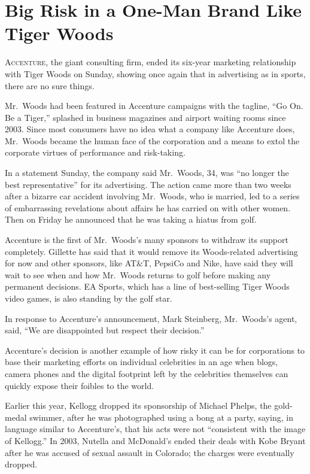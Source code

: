﻿\documentclass[12pt]{article}
\begin{document}
\section{Big Risk in a One-Man Brand Like Tiger Woods}

\lettrine{A}{ccenture}, the giant consulting firm, ended its six-year
marketing relationship with Tiger Woods on Sunday, showing once again that in advertising as in
sports, there are no sure things.

Mr.~Woods had been featured in Accenture campaigns with the tagline, ``Go On. Be a Tiger,'' splashed
in business magazines and airport waiting rooms since 2003. Since most consumers have no idea what a
company like Accenture does, Mr.~Woods became the human face of the corporation and a means to
extol\cite{extol} the corporate virtues of performance and risk-taking.

In a statement Sunday, the company said Mr.~Woods, 34, was ``no longer the best representative'' for
its advertising. The action came more than two weeks after a bizarre car accident involving
Mr.~Woods, who is married, led to a series of embarrassing revelations about affairs he has carried
on with other women. Then on Friday he announced that he was taking a hiatus\cite{hiatus} from golf.

Accenture is the first of Mr.~Woods's many sponsors to withdraw its support completely. Gillette has
said that it would remove its Woods-related advertising for now and other sponsors, like AT\&T,
PepsiCo and Nike, have said they will wait to see when and how Mr.~Woods returns to golf before
making any permanent decisions. EA Sports, which has a line of best-selling Tiger Woods video games,
is also standing by the golf star.

In response to Accenture's announcement, Mark Steinberg, Mr.~Woods's agent, said, ``We are
disappointed but respect their decision.''

Accenture's decision is another example of how risky it can be for corporations to base their
marketing efforts on individual celebrities in an age when blogs, camera phones and the digital
footprint left by the celebrities themselves can quickly expose their foibles\cite{foible} to the
world.

Earlier this year, Kellogg dropped its sponsorship of Michael Phelps, the gold-medal swimmer, after
he was photographed using a bong at a party, saying, in language similar to Accenture's, that his
acts were not ``consistent with the image of Kellogg.'' In 2003, Nutella and McDonald's ended their
deals with Kobe Bryant after he was accused of sexual assault in Colorado; the charges were
eventually dropped.
\end{document}
